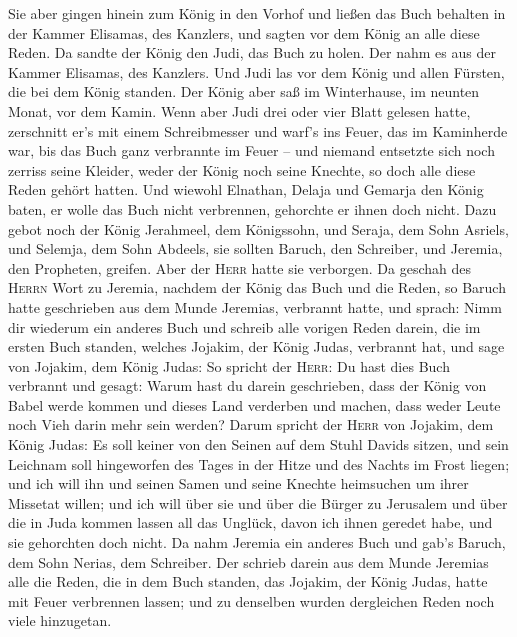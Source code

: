  Sie aber gingen hinein zum König in den Vorhof und
ließen das Buch behalten in der Kammer Elisamas, des Kanzlers, und
sagten vor dem König an alle diese Reden.  Da sandte der
König den Judi, das Buch zu holen. Der nahm es aus der Kammer Elisamas,
des Kanzlers. Und Judi las vor dem König und allen Fürsten, die bei dem
König standen.  Der König aber saß im Winterhause, im
neunten Monat, vor dem Kamin.  Wenn aber Judi drei oder
vier Blatt gelesen hatte, zerschnitt er's mit einem Schreibmesser und
warf's ins Feuer, das im Kaminherde war, bis das Buch ganz verbrannte im
Feuer --  und niemand entsetzte sich noch zerriss seine
Kleider, weder der König noch seine Knechte, so doch alle diese Reden
gehört hatten.  Und wiewohl Elnathan, Delaja und Gemarja
den König baten, er wolle das Buch nicht verbrennen, gehorchte er ihnen
doch nicht.  Dazu gebot noch der König Jerahmeel, dem
Königssohn, und Seraja, dem Sohn Asriels, und Selemja, dem Sohn Abdeels,
sie sollten Baruch, den Schreiber, und Jeremia, den Propheten, greifen.
Aber der \textsc{Herr} hatte sie verborgen.  Da geschah
des \textsc{Herrn} Wort zu Jeremia, nachdem der König das Buch und die
Reden, so Baruch hatte geschrieben aus dem Munde Jeremias, verbrannt
hatte, und sprach:  Nimm dir wiederum ein anderes Buch
und schreib alle vorigen Reden darein, die im ersten Buch standen,
welches Jojakim, der König Judas, verbrannt hat,  und
sage von Jojakim, dem König Judas: So spricht der \textsc{Herr}: Du hast
dies Buch verbrannt und gesagt: Warum hast du darein geschrieben, dass
der König von Babel werde kommen und dieses Land verderben und machen,
dass weder Leute noch Vieh darin mehr sein werden?  Darum
spricht der \textsc{Herr} von Jojakim, dem König Judas: Es soll keiner
von den Seinen auf dem Stuhl Davids sitzen, und sein Leichnam soll
hingeworfen des Tages in der Hitze und des Nachts im Frost liegen;
 und ich will ihn und seinen Samen und seine Knechte
heimsuchen um ihrer Missetat willen; und ich will über sie und über die
Bürger zu Jerusalem und über die in Juda kommen lassen all das Unglück,
davon ich ihnen geredet habe, und sie gehorchten doch nicht.
 Da nahm Jeremia ein anderes Buch und gab's Baruch, dem
Sohn Nerias, dem Schreiber. Der schrieb darein aus dem Munde Jeremias
alle die Reden, die in dem Buch standen, das Jojakim, der König Judas,
hatte mit Feuer verbrennen lassen; und zu denselben wurden dergleichen
Reden noch viele hinzugetan.

